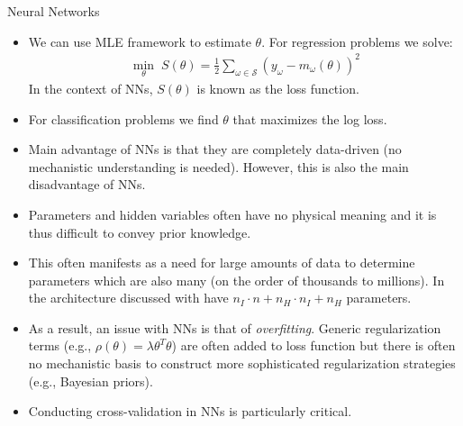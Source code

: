\documentclass[9pt]{beamer}
\begin{document}
\begin{frame}{Neural Networks}
\begin{itemize}
\item We can use MLE framework to estimate $\theta$. For regression problems we solve:
\begin{align*}
\min_{\theta}\; S(\theta)=\frac{1}{2}\sum_{\omega\in \mathcal{S}}(y_\omega - m_\omega(\theta))^2
\end{align*}
In the context of NNs, $S(\theta)$ is known as the loss function.  
\item For classification problems we find $\theta$ that maximizes the log loss. 

\item Main advantage of NNs is that they are completely data-driven (no mechanistic understanding is needed). However, this is also the main disadvantage of NNs. 

\item Parameters and hidden variables often have no physical meaning and it is thus difficult to convey prior knowledge. 

\item This often manifests as a need for large amounts of data to determine parameters which are also many (on the order of thousands to millions). In the architecture discussed with have $n_I\cdot n+n_H\cdot n_I+n_H$ parameters.

\item As a result, an issue with NNs is that of {\em overfitting}.  Generic regularization terms (e.g., $\rho(\theta)=\lambda \theta^T\theta$) are often added to loss function but there is often no mechanistic basis to construct more sophisticated regularization strategies (e.g., Bayesian priors). 

\item Conducting cross-validation in NNs is particularly critical. 

\end{itemize}

\end{frame}
\end{document}
